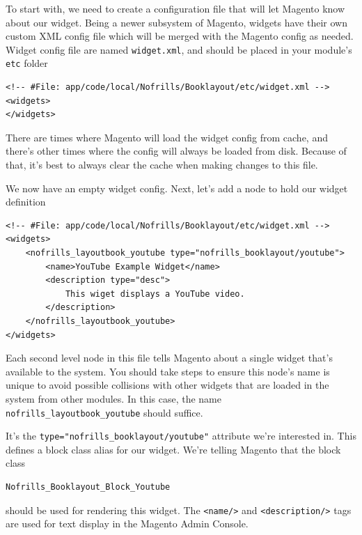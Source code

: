 \documentclass[oneside]{book}
\begin{document}
To start with, we need to create a configuration file that will let Magento know about our widget.  Being a newer subsystem of Magento, widgets have their own custom XML config file which will be merged with the Magento config as needed.  Widget config file are named \footnotesize\texttt{widget.xml}\normalsize, and should be placed in your module's \footnotesize\texttt{etc} \normalsize  folder

\begin{lstlisting}
<!-- #File: app/code/local/Nofrills/Booklayout/etc/widget.xml -->
<widgets>
</widgets>

\end{lstlisting}


There are times where Magento will load the widget config from cache, and there's other times where the config will always be loaded from disk. Because of that, it's best to always clear the cache when making changes to this file.

We now have an empty widget config.  Next, let's add a node to hold our widget definition

\begin{lstlisting}
<!-- #File: app/code/local/Nofrills/Booklayout/etc/widget.xml -->
<widgets>
    <nofrills_layoutbook_youtube type="nofrills_booklayout/youtube">
        <name>YouTube Example Widget</name>
        <description type="desc">
            This wiget displays a YouTube video.
        </description>
    </nofrills_layoutbook_youtube>
</widgets>

\end{lstlisting}


Each second level node in this file tells Magento about a single widget that's available to the system.  You should take steps to ensure this node's name is  unique to avoid possible collisions with other widgets that are loaded in the system from other modules. In this case, the name \footnotesize\texttt{nofrills\_layoutbook\_youtube} \normalsize  should suffice.

It's the \footnotesize\texttt{type="nofrills\_booklayout/youtube"} \normalsize  attribute we're interested in.  This defines a block class alias for our widget.  We're telling Magento that the block class

\begin{lstlisting}
Nofrills_Booklayout_Block_Youtube

\end{lstlisting}


should be used for rendering this widget.  The \footnotesize\texttt{\textless name/\textgreater } \normalsize  and \footnotesize\texttt{\textless description/\textgreater } \normalsize  tags are used for text display in the Magento Admin Console.
\end{document}

